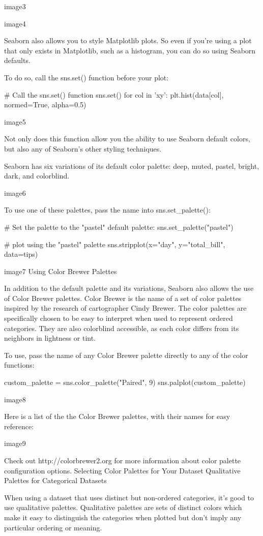 \documentclass{journal}
\begin{document}
image3

image4

Seaborn also allows you to style Matplotlib plots. So even if you’re using a plot that only exists in Matplotlib, such as a histogram, you can do so using Seaborn defaults.

To do so, call the sns.set() function before your plot:

# Call the sns.set() function 
sns.set()
for col in 'xy':
  plt.hist(data[col], normed=True, alpha=0.5)

image5

Not only does this function allow you the ability to use Seaborn default colors, but also any of Seaborn’s other styling techniques.

Seaborn has six variations of its default color palette: deep, muted, pastel, bright, dark, and colorblind.

image6

To use one of these palettes, pass the name into sns.set_palette():

# Set the palette to the "pastel" default palette:
sns.set_palette("pastel")

# plot using the "pastel" palette
sns.stripplot(x="day", y="total_bill", data=tips)

image7
Using Color Brewer Palettes

In addition to the default palette and its variations, Seaborn also allows the use of Color Brewer palettes. Color Brewer is the name of a set of color palettes inspired by the research of cartographer Cindy Brewer. The color palettes are specifically chosen to be easy to interpret when used to represent ordered categories. They are also colorblind accessible, as each color differs from its neighbors in lightness or tint.

To use, pass the name of any Color Brewer palette directly to any of the color functions:

custom_palette = sns.color_palette("Paired", 9)
sns.palplot(custom_palette)

image8

Here is a list of the the Color Brewer palettes, with their names for easy reference:

image9

Check out http://colorbrewer2.org for more information about color palette configuration options.
Selecting Color Palettes for Your Dataset
Qualitative Palettes for Categorical Datasets

When using a dataset that uses distinct but non-ordered categories, it’s good to use qualitative palettes. Qualitative palettes are sets of distinct colors which make it easy to distinguish the categories when plotted but don’t imply any particular ordering or meaning.
\end{document}
